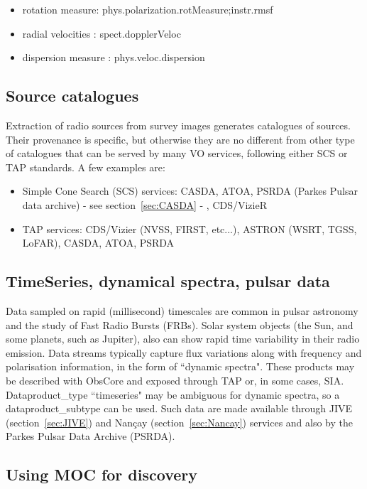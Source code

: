 \documentclass[11pt,a4paper]{ivoa}
\begin{document}
\begin{itemize}
    \item rotation measure: phys.polarization.rotMeasure;instr.rmsf
    \item radial velocities : spect.dopplerVeloc
    \item dispersion measure : phys.veloc.dispersion
\end{itemize}

\subsection{Source catalogues}
Extraction of radio sources from survey images generates catalogues of sources. Their provenance is specific, but otherwise they are no different from other type of catalogues that can be served by many VO services, following either SCS \citep{std:SCS} or TAP standards. A few examples are:
\begin{itemize}
\item Simple Cone Search (SCS) services: CASDA, ATOA, PSRDA (Parkes Pulsar data archive) - see section~\ref{sec:CASDA} - , CDS/VizieR
\item TAP services: CDS/Vizier (NVSS, FIRST, etc...), ASTRON (WSRT, TGSS, LoFAR), CASDA, ATOA, PSRDA 
\end{itemize}


\subsection{TimeSeries, dynamical spectra, pulsar data}

Data sampled on rapid (millisecond) timescales are common in pulsar astronomy and the study of Fast Radio Bursts (FRBs). 
Solar system objects (the Sun, and some planets, such as Jupiter), also can show rapid time variability in their radio emission. Data streams typically capture flux variations along with frequency and polarisation information, in the form of ``dynamic spectra".
These products may be described with ObsCore and exposed through TAP or, in some cases, SIA. Dataproduct\_type ``timeseries" may be ambiguous for dynamic spectra, so a dataproduct\_subtype can be used. Such data are made available through JIVE (section~\ref{sec:JIVE}) and Nan\c cay (section~\ref{sec:Nancay}) services and also  by the Parkes Pulsar Data Archive (PSRDA).

\subsection{Using MOC for discovery}
\end{document}
